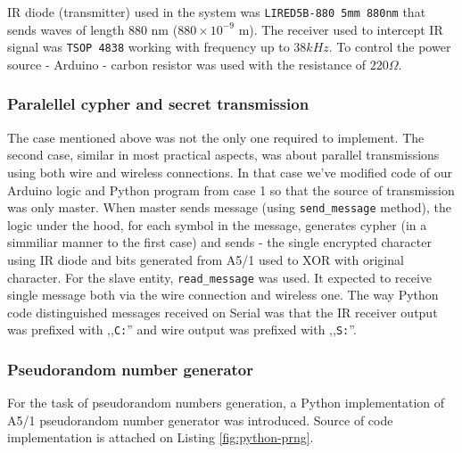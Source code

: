 IR diode (transmitter) used in the system was \texttt{LIRED5B-880 5mm 880nm} that sends waves of length 880 nm ($880 \times 10^{-9}$ m). The receiver used to intercept IR signal was \texttt{TSOP 4838} working with frequency up to $38 kHz$. To control the power source - Arduino - carbon resistor was used with the resistance of $220 \Omega.$


\subsubsection{Paralellel cypher and secret transmission}
The case mentioned above was not the only one required to implement. The second case, similar in most practical aspects, was about parallel transmissions using both wire and wireless connections. In that case we've modified code of our Arduino logic and Python program from case 1 so that the source of transmission was only master. When master sends message (using \texttt{send\_message} method), the logic under the hood, for each symbol in the message, generates cypher (in a simmiliar manner to the first case) and sends - the single encrypted character using IR diode and bits generated from A5/1 used to XOR with original character. For the slave entity, \texttt{read\_message} was used. It expected to receive single message both via the wire connection and wireless one. The way Python code distinguished messages received on Serial was that the IR receiver output was prefixed with ,,\texttt{C:}'' and wire output was prefixed with ,,\texttt{S:}''.

\subsubsection{Pseudorandom number generator}
For the task of pseudorandom numbers generation, a Python implementation of A5/1 pseudorandom number generator was introduced. Source of code implementation is attached on Listing \ref{fig:python-prng}.


